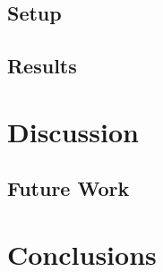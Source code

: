 \documentclass[twoside,openright]{uva-bachelor-thesis}
\begin{document}
\section{Setup}
\section{Results}

\chapter{Discussion}
\section{Future Work}
\chapter{Conclusions}


\printbibliography{}
\end{document}
